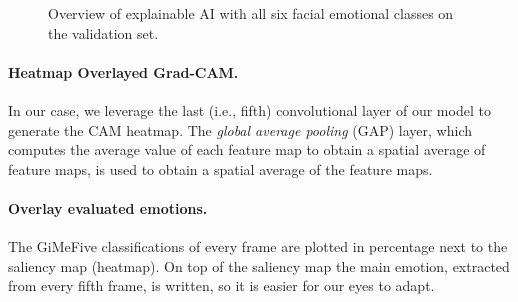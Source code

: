 \begin{figure}[ht]
  \caption{Overview of explainable AI with all six facial emotional classes on the validation set.}
  \label{fig:xai}
\end{figure}

\paragraph{Heatmap Overlayed Grad-CAM.}
In our case, we leverage the last (i.e., fifth) convolutional layer of our model to generate the CAM heatmap. 
The \textit{global average pooling} (GAP) layer, 
which computes the average value of each feature map to obtain a spatial average of feature maps, 
is used to obtain a spatial average of the feature maps. 

\paragraph{Overlay evaluated emotions.} %
The GiMeFive classifications of every frame are plotted in percentage next to the saliency map (heatmap).
On top of the saliency map the main emotion, extracted from every fifth frame, is written, so it is easier for our eyes to adapt.

